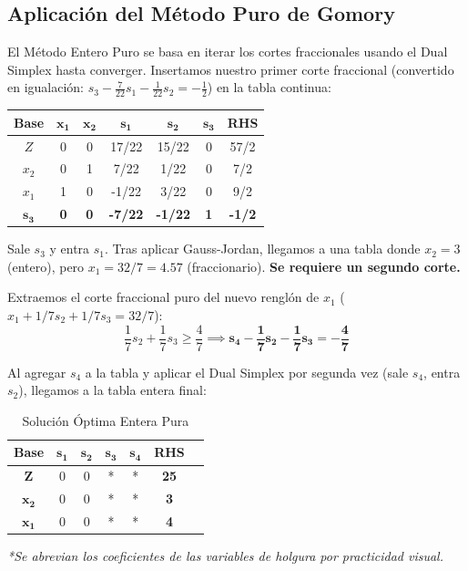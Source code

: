 \documentclass[10pt,a4paper]{article}
\begin{document}
\subsection{Aplicación del Método Puro de Gomory}

El Método Entero Puro se basa en iterar los cortes fraccionales usando el Dual Simplex hasta converger. Insertamos nuestro primer corte fraccional (convertido en igualación: $s_3 - \frac{7}{22}s_1 - \frac{1}{22}s_2 = -\frac{1}{2}$) en la tabla continua:

\begin{table}[H]
    \centering
    \begin{tabular}{c c c c c c | c}
    \toprule
    \textbf{Base} & $\mathbf{x_1}$ & $\mathbf{x_2}$ & $\mathbf{s_1}$ & $\mathbf{s_2}$ & $\mathbf{s_3}$ & \textbf{RHS} \\
    \midrule
    $Z$   & 0 & 0 & 17/22 & 15/22 & 0 & 57/2 \\
    $x_2$ & 0 & 1 & 7/22 & 1/22 & 0 & 7/2 \\
    $x_1$ & 1 & 0 & -1/22 & 3/22 & 0 & 9/2 \\
    $\mathbf{s_3}$ & \textbf{0} & \textbf{0} & \textbf{-7/22} & \textbf{-1/22} & \textbf{1} & \textbf{-1/2} \\
    \bottomrule
    \end{tabular}
\end{table}

Sale $s_3$ y entra $s_1$. Tras aplicar Gauss-Jordan, llegamos a una tabla donde $x_2 = 3$ (entero), pero $x_1 = 32/7 = 4.57$ (fraccionario). \textbf{Se requiere un segundo corte.}

Extraemos el corte fraccional puro del nuevo renglón de $x_1$ ($x_1 + 1/7 s_2 + 1/7 s_3 = 32/7$):
\[ \frac{1}{7}s_2 + \frac{1}{7}s_3 \geq \frac{4}{7} \implies \mathbf{s_4 - \frac{1}{7}s_2 - \frac{1}{7}s_3 = -\frac{4}{7}} \]

Al agregar $s_4$ a la tabla y aplicar el Dual Simplex por segunda vez (sale $s_4$, entra $s_2$), llegamos a la tabla entera final:

\begin{table}[H]
    \centering
    \begin{tabular}{c | c c c c c | c}
    \toprule
    \textbf{Base} & $\mathbf{s_1}$ & $\mathbf{s_2}$ & $\mathbf{s_3}$ & $\mathbf{s_4}$ & \textbf{RHS} \\
    \midrule
    $\mathbf{Z}$   & 0 & 0 & * & * & \textbf{25} \\
    $\mathbf{x_2}$ & 0 & 0 & * & * & \textbf{3} \\
    $\mathbf{x_1}$ & 0 & 0 & * & * & \textbf{4} \\
    \bottomrule
    \end{tabular}
    \caption{Solución Óptima Entera Pura}
\end{table}
\textit{*Se abrevian los coeficientes de las variables de holgura por practicidad visual.}
\end{document}
